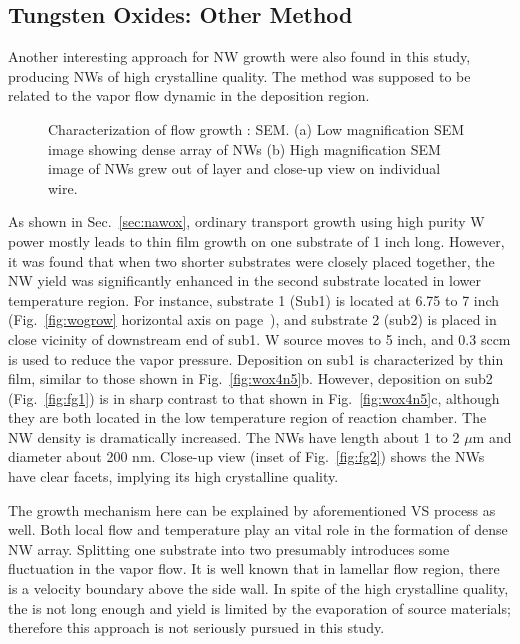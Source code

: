 \subsection{Tungsten Oxides: Other Method}

Another interesting approach for  NW growth were also found in this study, producing  NWs of high crystalline quality. The method was supposed to be related to the vapor flow dynamic in the deposition region. 
\begin{figure}[htb]
\centering
{}\hspace{0.04\textwidth}
\caption[Characterization of flow growth : SEM]{Characterization of flow growth : SEM. (a) Low magnification SEM image showing dense array of NWs (b) High magnification SEM image of NWs grew out of layer and close-up view on individual wire.}
\label{fig:wogrowsf}
\end{figure}
As shown in Sec.~\ref{sec:nawox}, ordinary transport growth using high purity W power mostly leads to thin film growth on one substrate of 1 inch long. However, it was found that when two shorter substrates were closely placed together, the  NW yield was significantly enhanced in the second substrate located in lower temperature region. For instance, substrate 1 (Sub1) is located at 6.75 to 7 inch (Fig.~\ref{fig:wogrow} horizontal axis on page~\pageref{fig:wogrow}), and substrate 2 (sub2) is placed in close vicinity of downstream end of sub1. W source moves to 5 inch, and 0.3 sccm  is used to reduce the  vapor pressure. Deposition on sub1 is characterized by thin film, similar to those shown in Fig.~\ref{fig:wox4n5}b. However, deposition on sub2 (Fig.~\ref{fig:fg1}) is in sharp contrast to that shown in Fig.~\ref{fig:wox4n5}c, although they are both located in the low temperature region of reaction chamber. The NW density is dramatically increased. The NWs have length about 1 to 2 $\mu$m and diameter about 200 nm. Close-up view (inset of Fig.~\ref{fig:fg2}) shows the NWs have clear facets, implying its high crystalline quality.

The growth mechanism here can be explained by aforementioned VS process as well. Both local flow and temperature play an vital role in the formation of dense NW array. Splitting one substrate into two presumably introduces some fluctuation in the vapor flow. It is well known that in lamellar flow region, there is a velocity boundary above the side wall. In spite of the high crystalline quality, the  is not long enough and yield is limited by the evaporation of source materials; therefore this approach is not seriously pursued in this study. 

